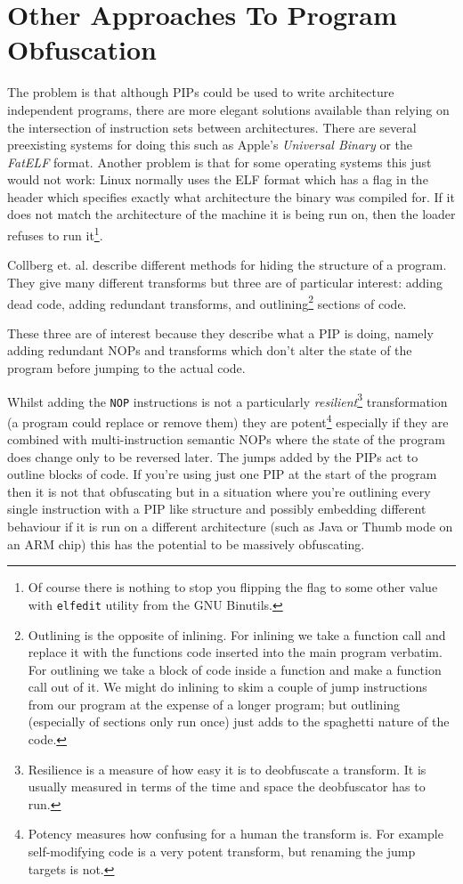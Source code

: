 \documentclass[10pt,]{book}
\begin{document}
\section{Other Approaches To Program Obfuscation}

The problem is that although PIPs could be used to write architecture
independent programs, there are more elegant solutions available than
relying on the intersection of instruction sets between architectures.
There are several preexisting systems for doing this such as Apple's
\emph{Universal Binary} or the \emph{FatELF}\autocite{Icculus:vl}
format. Another problem is that for some operating systems this just
would not work: Linux normally uses the ELF format\autocite{mancx:th}
which has a flag in the header which specifies exactly what architecture
the binary was compiled for. If it does not match the architecture of
the machine it is being run on, then the loader refuses to run
it\footnote{Of course there is nothing to stop you flipping the flag to
  some other value with \lstinline!elfedit! utility from the GNU
  Binutils.}.

Collberg et. al. \autocite{Collberg:1997vt} describe different methods
for hiding the structure of a program. They give many different
transforms but three are of particular interest: adding dead code,
adding redundant transforms, and outlining\footnote{Outlining is the
  opposite of inlining. For inlining we take a function call and replace
  it with the functions code inserted into the main program verbatim.
  For outlining we take a block of code inside a function and make a
  function call out of it. We might do inlining to skim a couple of jump
  instructions from our program at the expense of a longer program; but
  outlining (especially of sections only run once) just adds to the
  spaghetti nature of the code.} sections of code.

These three are of interest because they describe what a PIP is doing,
namely adding redundant NOPs and transforms which don't alter the state
of the program before jumping to the actual code.

Whilst adding the \lstinline!NOP! instructions is not a particularly
\emph{resilient}\footnote{Resilience is a measure of how easy it is to
  deobfuscate a transform. It is usually measured in terms of the time
  and space the deobfuscator has to run.} transformation (a program
could replace or remove them) they are potent\footnote{Potency measures
  how confusing for a human the transform is. For example self-modifying
  code is a very potent transform, but renaming the jump targets is not.}
especially if they are combined with multi-instruction semantic NOPs
where the state of the program does change only to be reversed later.
The jumps added by the PIPs act to outline blocks of code. If you're
using just one PIP at the start of the program then it is not that
obfuscating but in a situation where you're outlining every single
instruction with a PIP like structure and possibly embedding different
behaviour if it is run on a different architecture (such as Java or
Thumb mode on an ARM chip) this has the potential to be massively
obfuscating.
\end{document}
